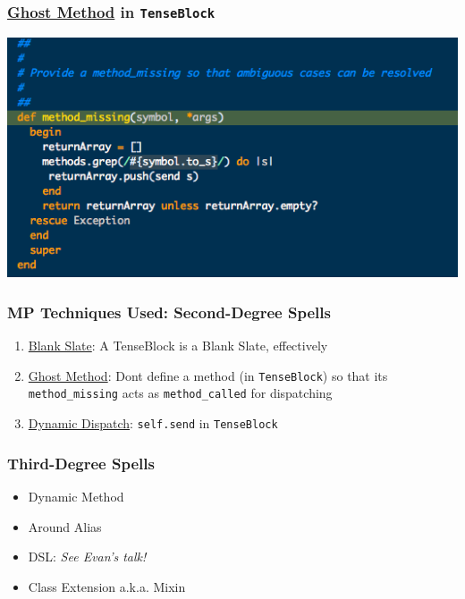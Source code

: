 \documentclass[slidestop,compress,mathserif]{beamer}
\begin{document}
\begin{frame}
	\frametitle{\underline{Ghost Method} in \texttt{TenseBlock}}
	\begin{center}
		\includegraphics[scale=0.45]{img/tenseblock_mm.png}
	\end{center}

\end{frame}

\begin{frame}
	\frametitle{MP Techniques Used:  Second-Degree Spells}
	\begin{enumerate}
		\item \underline{Blank Slate}:  A TenseBlock is a Blank Slate, effectively
		\item \underline{Ghost Method}:  Dont define a method (in \texttt{TenseBlock}) so that its \texttt{method\_missing} acts as \texttt{method\_called} for dispatching
		\item \underline{Dynamic Dispatch}:  \texttt{self.send} in \texttt{TenseBlock}
	\end{enumerate}
\end{frame}

\begin{frame}
	\frametitle{Third-Degree Spells}
	\begin{itemize}
		\item Dynamic Method
		\item Around Alias
		\item DSL:  \emph{See Evan's talk!}
		\item Class Extension a.k.a. Mixin
	\end{itemize}
\end{frame}
\end{document}
